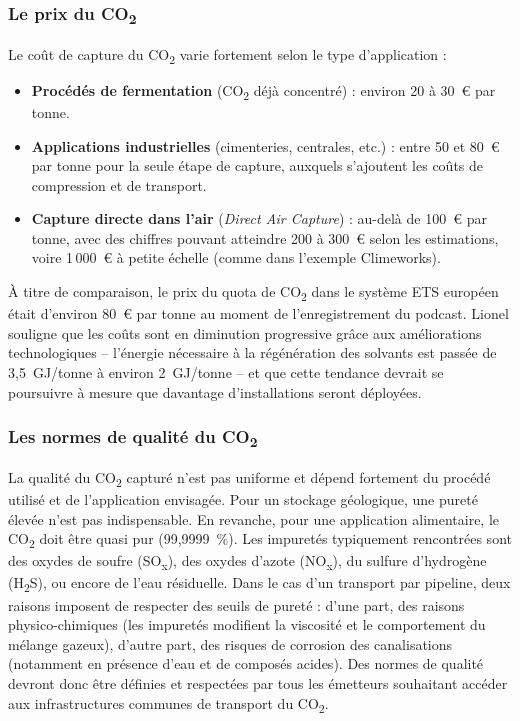 \subsubsection{Le prix du CO\texorpdfstring{\textsubscript{2}}{2}}
Le coût de capture du CO\textsubscript{2} varie fortement selon le type d'application :
\begin{itemize}
    \item \textbf{Procédés de fermentation} (CO\textsubscript{2} déjà concentré) : environ 20 à 30~€ par tonne.
    \item \textbf{Applications industrielles} (cimenteries, centrales, etc.) : entre 50 et 80~€ par tonne pour la seule étape de capture, auxquels s'ajoutent les coûts de compression et de transport.
    \item \textbf{Capture directe dans l'air} (\textit{Direct Air Capture}) : au-delà de 100~€ par tonne, avec des chiffres pouvant atteindre 200 à 300~€ selon les estimations, voire 1\,000~€ à petite échelle (comme dans l'exemple Climeworks).
\end{itemize}
À titre de comparaison, le prix du quota de CO\textsubscript{2} dans le système ETS européen était d'environ 80~€ par tonne au moment de l'enregistrement du podcast. Lionel souligne que les coûts sont en diminution progressive grâce aux améliorations technologiques -- l'énergie nécessaire à la régénération des solvants est passée de 3,5~GJ/tonne à environ 2~GJ/tonne -- et que cette tendance devrait se poursuivre à mesure que davantage d'installations seront déployées.

\subsubsection{Les normes de qualité du CO\texorpdfstring{\textsubscript{2}}{2}}
La qualité du CO\textsubscript{2} capturé n'est pas uniforme et dépend fortement du procédé utilisé et de l'application envisagée. Pour un stockage géologique, une pureté élevée n'est pas indispensable. En revanche, pour une application alimentaire, le CO\textsubscript{2} doit être quasi pur (99,9999~\%). Les impuretés typiquement rencontrées sont des oxydes de soufre (SO\textsubscript{x}), des oxydes d'azote (NO\textsubscript{x}), du sulfure d'hydrogène (H\textsubscript{2}S), ou encore de l'eau résiduelle. Dans le cas d'un transport par pipeline, deux raisons imposent de respecter des seuils de pureté : d'une part, des raisons physico-chimiques (les impuretés modifient la viscosité et le comportement du mélange gazeux), d'autre part, des risques de corrosion des canalisations (notamment en présence d'eau et de composés acides). Des normes de qualité devront donc être définies et respectées par tous les émetteurs souhaitant accéder aux infrastructures communes de transport du CO\textsubscript{2}.